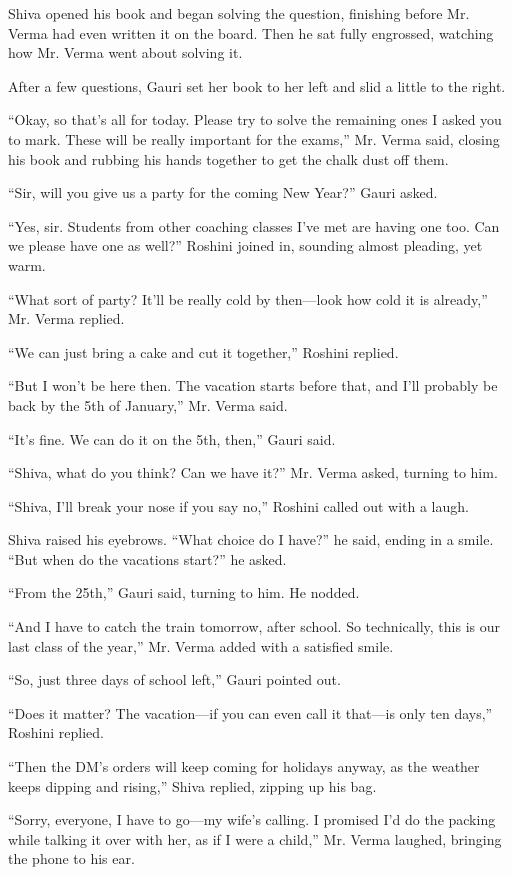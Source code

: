 Shiva opened his book and began solving the question, finishing before Mr. Verma had even written it on the board. Then he sat fully engrossed, watching how Mr. Verma went about solving it.

After a few questions, Gauri set her book to her left and slid a little to the right.

``Okay, so that's all for today. Please try to solve the remaining ones I asked you to mark. These will be really important for the exams,'' Mr. Verma said, closing his book and rubbing his hands together to get the chalk dust off them.

``Sir, will you give us a party for the coming New Year?'' Gauri asked.

``Yes, sir. Students from other coaching classes I've met are having one too. Can we please have one as well?'' Roshini joined in, sounding almost pleading, yet warm.

``What sort of party? It'll be really cold by then—look how cold it is already,'' Mr. Verma replied.

``We can just bring a cake and cut it together,'' Roshini replied.

``But I won't be here then. The vacation starts before that, and I'll probably be back by the 5th of January,'' Mr. Verma said.

``It's fine. We can do it on the 5th, then,'' Gauri said.

``Shiva, what do you think? Can we have it?'' Mr. Verma asked, turning to him.

``Shiva, I'll break your nose if you say no,'' Roshini called out with a laugh.

Shiva raised his eyebrows. ``What choice do I have?'' he said, ending in a smile. ``But when do the vacations start?'' he asked. 

``From the 25th,'' Gauri said, turning to him. He nodded.

``And I have to catch the train tomorrow, after school. So technically, this is our last class of the year,'' Mr. Verma added with a satisfied smile.

``So, just three days of school left,'' Gauri pointed out.

``Does it matter? The vacation—if you can even call it that—is only ten days,'' Roshini replied.

``Then the DM's orders will keep coming for holidays anyway, as the weather keeps dipping and rising,'' Shiva replied, zipping up his bag.

``Sorry, everyone, I have to go—my wife's calling. I promised I'd do the packing while talking it over with her, as if I were a child,'' Mr. Verma laughed, bringing the phone to his ear.

